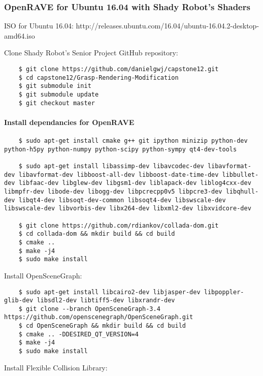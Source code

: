 \subsubsection{OpenRAVE for Ubuntu 16.04 with Shady Robot's Shaders}

ISO for Ubuntu 16.04: http://releases.ubuntu.com/16.04/ubuntu-16.04.2-desktop-amd64.iso

Clone Shady Robot's Senior Project GitHub repository:

\begin{lstlisting}
    $ git clone https://github.com/danielgwj/capstone12.git
    $ cd capstone12/Grasp-Rendering-Modification
    $ git submodule init
    $ git submodule update
    $ git checkout master
\end{lstlisting}

\paragraph{Install dependancies for OpenRAVE}

\begin{lstlisting}
    $ sudo apt-get install cmake g++ git ipython minizip python-dev python-h5py python-numpy python-scipy python-sympy qt4-dev-tools

    $ sudo apt-get install libassimp-dev libavcodec-dev libavformat-dev libavformat-dev libboost-all-dev libboost-date-time-dev libbullet-dev libfaac-dev libglew-dev libgsm1-dev liblapack-dev liblog4cxx-dev libmpfr-dev libode-dev libogg-dev libpcrecpp0v5 libpcre3-dev libqhull-dev libqt4-dev libsoqt-dev-common libsoqt4-dev libswscale-dev libswscale-dev libvorbis-dev libx264-dev libxml2-dev libxvidcore-dev

    $ git clone https://github.com/rdiankov/collada-dom.git
    $ cd collada-dom && mkdir build && cd build
    $ cmake ..
    $ make -j4
    $ sudo make install
\end{lstlisting}

Install OpenSceneGraph:

\begin{lstlisting}
    $ sudo apt-get install libcairo2-dev libjasper-dev libpoppler-glib-dev libsdl2-dev libtiff5-dev libxrandr-dev
    $ git clone --branch OpenSceneGraph-3.4 https://github.com/openscenegraph/OpenSceneGraph.git
    $ cd OpenSceneGraph && mkdir build && cd build
    $ cmake .. -DDESIRED_QT_VERSION=4
    $ make -j4
    $ sudo make install
\end{lstlisting}

Install Flexible Collision Library:

